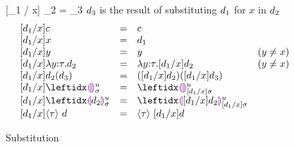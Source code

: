 \begin{figure}[t]
\judgbox
  {[\dexp_1 / x] \dexp_2 = \dexp_3}
  {$d_3$ is the result of substituting $d_1$ for $x$ in $d_2$}
\[
\begin{array}{lcll}
[\dexp_1 / x] c
&=&
c\\
{[\dexp_1 / x] x}
&=&
\dexp_1\\
{[\dexp_1 / x] y}
&=&
y & (y \neq x)\\
{[\dexp_1 / x] \halam{y}{\htau}{\dexp_2}}
&=&
{\halam{y}{\htau}{[\dexp_1 / x] \dexp_2}}
& (y \neq x)
\\
{[\dexp_1 / x] \dap{d_2}{d_3}}
&=&
{\dapP{[\dexp_1 / x] d_2}{[\dexp_1 / x] d_3}}
\\
{[\dexp_1 / x]} \dehole{\mvar}{\subst}{}
&=&
\dehole{\mvar}{[\dexp_1 / x] \subst}{}
\\
{[\dexp_1 / x] \dhole{\dexp_2}{\mvar}{\subst}{}}
&=&
\dhole{ [ \dexp_1 / x ] \dexp_2 }{\mvar}{[\dexp_1 / x] \subst}{}
\\
{[\dexp_1 / x] \dcast{\htau}{\dexp}}
&=&
\dcast{\htau}{[\dexp_1 / x] \dexp}
\end{array}
\]
\caption{Substitution}
\end{figure}
